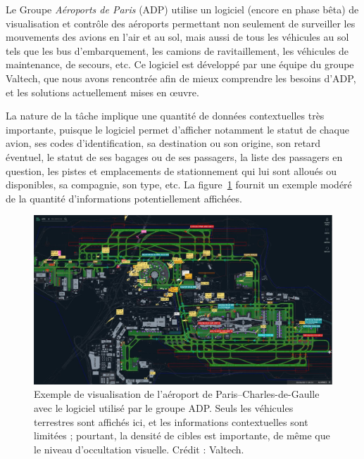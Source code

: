 	
	Le Groupe \emph{Aéroports de Paris} (ADP) utilise un logiciel (encore en phase bêta) de visualisation et contrôle des aéroports permettant non seulement de surveiller les mouvements des avions en l'air et au sol, mais aussi de tous les véhicules au sol tels que les bus d'embarquement, les camions de ravitaillement, les véhicules de maintenance, de secours, etc. Ce logiciel est développé par une équipe du groupe Valtech\footnotemark{}, que nous avons rencontrée afin de mieux comprendre les besoins d'ADP, et les solutions actuellement mises en \oe{}uvre.
	
	
	La nature de la tâche implique une quantité de données contextuelles très importante, puisque le logiciel permet d'afficher notamment le statut de chaque avion, ses codes d'identification, sa destination ou son origine, son retard éventuel, le statut de ses bagages ou de ses passagers, la liste des passagers en question, les pistes et emplacements de stationnement qui lui sont alloués ou disponibles, sa compagnie, son type, etc. La figure~\ref{fig:adp} fournit un exemple modéré de la quantité d'informations potentiellement affichées.
	
	\begin{figure}[!htbp]
		\centering
		\includegraphics[width=\textwidth]{figures/ch1/adp}
		\caption[ADP -- Roissy]{Exemple de visualisation de l'aéroport de Paris--Charles-de-Gaulle avec le logiciel utilisé par le groupe ADP. Seuls les véhicules terrestres sont affichés ici, et les informations contextuelles sont limitées ; pourtant, la densité de cibles est importante, de même que le niveau d'occultation visuelle. Crédit : Valtech.}
		\label{fig:adp}
	\end{figure}
	
